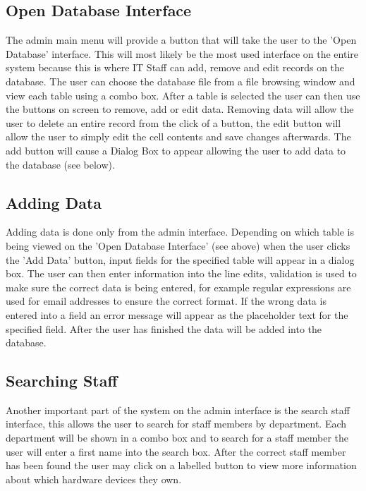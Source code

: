 \subsection{Open Database Interface}

The admin main menu will provide a button that will take the user to the 'Open Database' interface. This will most likely be the most used interface on the entire system because this is where IT Staff can add, remove and edit records on the database. The user can choose the database file from a file browsing window and view each table using a combo box. After a table is selected the user can then use the buttons on screen to remove, add or edit data. Removing data will allow the user to delete an entire record from the click of a button, the edit button will allow the user to simply edit the cell contents and save changes afterwards. The add button will cause a Dialog Box to appear allowing the user to add data to the database (see below).

\subsection{Adding Data}

Adding data is done only from the admin interface. Depending on which table is being viewed on the 'Open Database Interface' (see above) when the user clicks the 'Add Data' button, input fields for the specified table will appear in a dialog box. The user can then enter information into the line edits, validation is used to make sure the correct data is being entered, for example regular expressions are used for email addresses to ensure the correct format. If the wrong data is entered into a field an error message will appear as the placeholder text for the specified field. After the user has finished the data will be added into the database.

\subsection{Searching Staff}

Another important part of the system on the admin interface is the search staff interface, this allows the user to search for staff members by department. Each department will be shown in a combo box and to search for a staff member the user will enter a first name into the search box. After the correct staff member has been found the user may click on a labelled button to view more information about which hardware devices they own.

